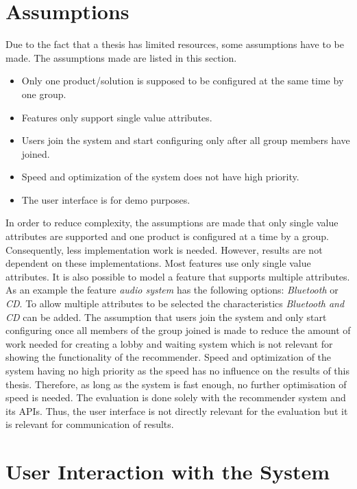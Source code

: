 \section{Assumptions}
\label{sec:Concept:Assumptions}

Due to the fact that a thesis has limited resources, some assumptions have to be made. The assumptions made are listed in this section.

\begin{itemize}
    \item Only one product/solution is supposed to be configured at the same time by one group.
    \item Features only support single value attributes.
    \item Users join the system and start configuring only after all group members have joined.
    \item Speed and optimization of the system does not have high priority.
    \item The user interface is for demo purposes.
\end{itemize}
In order to reduce complexity, the assumptions are made that only single value attributes are supported and one product is configured at a time by a group. Consequently, less implementation work is needed. However, results are not dependent on these implementations. Most features use only single value attributes. It is also possible to model a feature that supports multiple attributes. As an example the feature \emph{audio system} has the following options: \emph{Bluetooth} or \emph{CD}. To allow multiple attributes to be selected the characteristics \emph{Bluetooth and CD} can be added.
The assumption that users join the system and only start configuring once all members of the group joined is made to reduce the amount of work needed for creating a lobby and waiting system which is not relevant for showing the functionality of the recommender. Speed and optimization of the system having no high priority as the speed has no influence on the results of this thesis. Therefore, as long as the system is fast enough, no further optimisation of speed is needed.
The evaluation is done solely with the recommender system and its APIs. Thus, the user interface is not directly relevant for the evaluation but it is relevant for communication of results.

\section{User Interaction with the System}
\label{sec:Concept:UserSystemInteraction}

